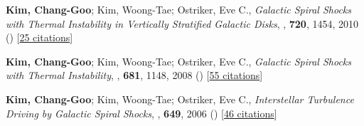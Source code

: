 \item[{38.}]\textbf{Kim, Chang-Goo}; Kim, Woong-Tae; Ostriker, Eve C., \textit{Galactic Spiral Shocks with Thermal Instability in Vertically Stratified Galactic Disks}, , \textbf{720}, 1454, 2010 () [\href{http://adsabs.harvard.edu/abs/2010ApJ...720.1454K}{25 citations}]

\item[{37.}]\textbf{Kim, Chang-Goo}; Kim, Woong-Tae; Ostriker, Eve C., \textit{Galactic Spiral Shocks with Thermal Instability}, , \textbf{681}, 1148, 2008 () [\href{http://adsabs.harvard.edu/abs/2008ApJ...681.1148K}{55 citations}]

\item[{36.}]\textbf{Kim, Chang-Goo}; Kim, Woong-Tae; Ostriker, Eve C., \textit{Interstellar Turbulence Driving by Galactic Spiral Shocks}, , \textbf{649}, 2006 () [\href{http://adsabs.harvard.edu/abs/2006ApJ...649L..13K}{46 citations}]
